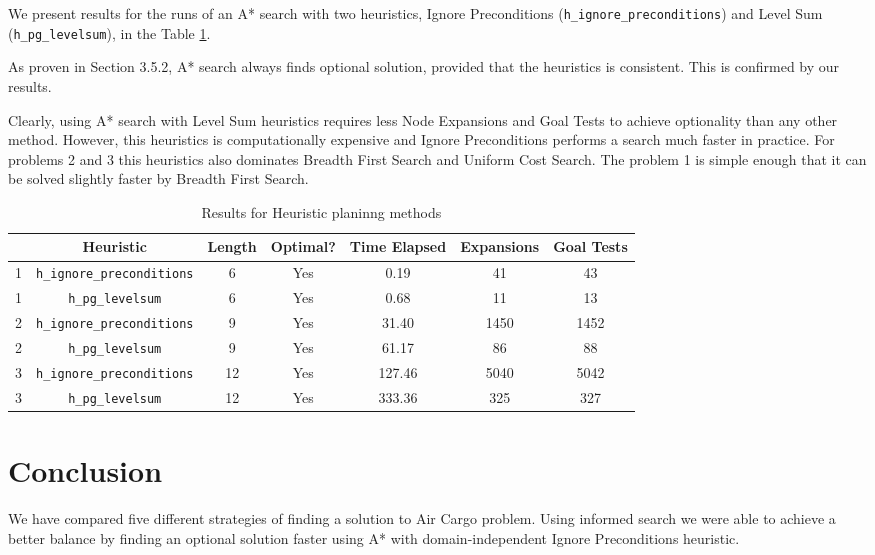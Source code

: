 \documentclass[oneside]{article}   	%
\newcommand{\hip}{\texttt{h\_ignore\_preconditions}}
\newcommand{\hpg}{\texttt{h\_pg\_levelsum}}
\begin{document}
We present results for the runs of an A* search with two heuristics, Ignore Preconditions (\hip) and Level Sum (\hpg), in the Table \ref{Heuristic}. 

As proven in Section 3.5.2, A* search always finds optional solution, provided that the heuristics is consistent. This is confirmed by our results.

Clearly, using A* search with Level Sum heuristics requires less Node Expansions and Goal Tests to achieve optionality than any other method. However, this heuristics is computationally expensive and Ignore Preconditions performs a search much faster in practice. For problems 2 and 3 this heuristics also dominates Breadth First Search and Uniform Cost Search. The problem 1 is simple enough that it can be solved slightly faster by Breadth First Search.

\begin{table}[ht]
\caption{Results for Heuristic planinng methods}
\begin{center}
\begin{tabular}{c|c|ccccc}
   & Heuristic & Length & Optimal? & Time Elapsed & Expansions & Goal Tests\\
   \hline
1 & \hip & 6 & Yes & 0.19 & 41 & 43 \\
1 & \hpg & 6 & Yes & 0.68 & 11 & 13 \\
   \hline
2 & \hip & 9 & Yes & 31.40 & 1450 & 1452 \\
2 & \hpg & 9 & Yes & 61.17 &  86 & 88  \\
   \hline
3 & \hip & 12 & Yes & 127.46 & 5040 & 5042 \\
3 & \hpg & 12 & Yes & 333.36 & 325 & 327 
\end{tabular}
\end{center}
\label{Heuristic}
\end{table}%

\section{Conclusion}

We have compared five different strategies of finding a solution to Air Cargo problem. Using informed search we were able to achieve a better balance by finding an optional solution faster using A* with domain-independent Ignore Preconditions heuristic. 
\end{document}
